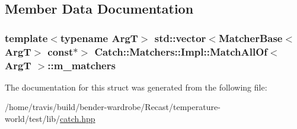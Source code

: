 \subsection{Member Data Documentation}
\hypertarget{struct_catch_1_1_matchers_1_1_impl_1_1_match_all_of_a98d6a2611f195a4a5c49f92fd877be9a}{
\subsubsection[{m\-\_\-matchers}]{\setlength{\rightskip}{0pt plus 5cm}template$<$typename Arg\-T$>$ std\-::vector$<${\bf Matcher\-Base}$<$Arg\-T$>$ const$\ast$$>$ {\bf Catch\-::\-Matchers\-::\-Impl\-::\-Match\-All\-Of}$<$ Arg\-T $>$\-::m\-\_\-matchers}}\label{struct_catch_1_1_matchers_1_1_impl_1_1_match_all_of_a98d6a2611f195a4a5c49f92fd877be9a}


The documentation for this struct was generated from the following file\-:\begin{DoxyCompactItemize}
\item 
/home/travis/build/bender-\/wardrobe/\-Recast/temperature-\/world/test/lib/\hyperlink{catch_8hpp}{catch.\-hpp}\end{DoxyCompactItemize}
